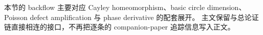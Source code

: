 \documentclass[../../../main.tex]{subfiles}
\begin{document}

\begin{remark}
本节的 backflow 主要对应 Cayley homeomorphism、basic circle dimension、Poisson defect amplification 与 phase derivative 的配套展开。
主文保留与总论证链直接相连的接口，不再把逐条的 companion-paper 追踪信息写入正文。
\end{remark}
\end{document}
